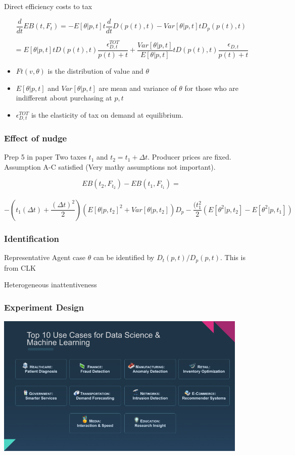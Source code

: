 \documentclass{beamer}
\begin{document}
\begin{frame}{Direct efficiency costs to tax}

\[
    \frac{d}{dt}EB(t,F_t) = -E[\theta|p,t]t \frac{d}{dt} D(p(t),t)-Var[\theta|p,t]tD_p(p(t),t)\]
   
  \[=E[\theta|p,t]tD(p(t),t)\frac{\epsilon^{TOT}_{D,t}}{p(t)+t}
+\frac{Var[\theta|p,t]}{E[\theta|p,t]}tD(p(t),t)\frac{\epsilon_{D,t}}{p(t)+t}
\]
  \begin{itemize}
      \item $Ft(v,\theta)$ is the distribution of value and $\theta$
      \item $E[\theta|p,t]$ and $Var[\theta|p,t]$ are mean and variance of $\theta$ for those who are indifferent about purchasing at $p,t$
      \item $\epsilon^{TOT}_{D,t}$ is the elasticity of tax on demand at equilibrium.
  \end{itemize}
\end{frame}
\begin{frame}
\frametitle{Effect of nudge}
 
\begin{block}{Prep 5 in paper}
Two taxes $t_1$ and $t_2=t_1+\Delta t$. Producer prices are fixed. Assumption A-C satisfied (Very mathy assumptions not important).
\end{block}
 
\[
EB(t_2,F_{t_2}) -EB(t_1,F_{t_1})=\]\\
\[ -(t_1(\Delta t)+\frac{(\Delta t)^2}{2})(E[\theta|p,t_2]^2+Var[\theta|p,t_2])D_p -\frac{(t_1^2}{2}(E[\theta^2|p,t_2]-E[\theta^2|p,t_1])
\]
\end{frame}
\begin{frame}
\frametitle{Identification}
\begin{block}{Representative Agent case}
$\theta$ can be identified by $D_t(p,t)/D_p(p,t)$. This is from CLK
\end{block}
\begin{block}{Heterogeneous inattentiveness}

\end{block}
\end{frame}
\begin{frame}
   \frametitle{Experiment Design}
   \includegraphics[height=6.8cm]{1_kTnSJQpzGw_w4uQKa_j7VQ.png}
\centering
\end{frame}
\end{document}
